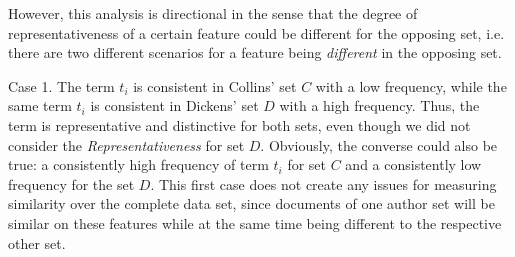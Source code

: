 \documentclass[a4paper,10pt,twoside,fleqn]{article}
\begin{document}
However, this analysis is directional in the sense that the degree
of representativeness of a certain feature could be different 
for the opposing set, i.e. there are two different scenarios
for a feature being \emph{different} in the opposing set. 

Case 1. The term $t_i$ is consistent in Collins' set $C$ with a low
frequency, while the same term $t_i$ is consistent in Dickens' set $D$
with a high frequency. 
Thus, the term is representative and distinctive for both sets, 
even though we did not consider the \emph{Representativeness} for set $D$. 
Obviously, the converse could also be true: a consistently high frequency 
of term $t_i$ for set $C$ and a consistently low frequency for the set $D$.
This first case does not create any issues for measuring similarity over the
complete data set, since documents of one author set will be similar on 
these features while at the same time being different to the respective other set.
\end{document}
